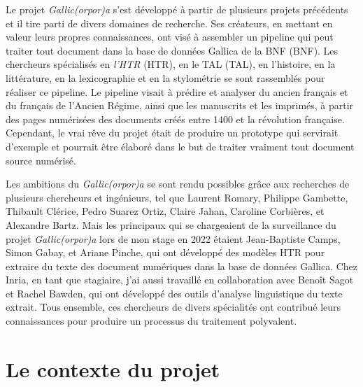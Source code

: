 \documentclass[class=article, crop=false]{standalone}
\begin{document}
Le projet \textit{Gallic(orpor)a} s'est développé à partir de plusieurs projets précédents et il tire parti de divers domaines de recherche. Ses créateurs, en mettant en valeur leurs propres connaissances, ont visé à assembler un pipeline qui peut traiter tout document dans la base de données Gallica de la \acrlong{BNF} (\acrshort{BNF}). Les chercheurs spécialisés en \textit{l'\acrlong{HTR}} (\acrshort{HTR}), en le \acrlong{TAL} (\acrshort{TAL}), en l'histoire, en la littérature, en la lexicographie et en la stylométrie se sont rassemblés pour réaliser ce pipeline. Le pipeline visait à prédire et analyser du ancien français et du français de l'Ancien Régime, ainsi que les manuscrits et les imprimés, à partir des pages numérisées des documents créés entre 1400 et la révolution française. Cependant, le vrai rêve du projet était de produire un prototype qui servirait d'exemple et pourrait être élaboré dans le but de traiter vraiment tout document source numérisé.

Les ambitions du \textit{Gallic(orpor)a} se sont rendu possibles grâce aux recherches de plusieurs chercheurs et ingénieurs, tel que Laurent Romary, Philippe Gambette, Thibault Clérice, Pedro Suarez Ortiz, Claire Jahan, Caroline Corbières, et Alexandre Bartz. Mais les principaux qui se chargeaient de la surveillance du projet \textit{Gallic(orpor)a} lors de mon stage en 2022 étaient Jean-Baptiste Camps, Simon Gabay, et Ariane Pinche, qui ont développé des modèles \acrshort{HTR} pour extraire du texte des document numériques dans la base de données Gallica. Chez \Gls{Inria}, en tant que stagiaire, j'ai aussi travaillé en collaboration avec  Benoît Sagot et Rachel Bawden, qui ont développé des outils d'analyse linguistique du texte extrait. Tous ensemble, ces chercheurs de divers spécialités ont contribué leurs connaissances pour produire un processus du traitement polyvalent.

\section{Le contexte du projet}
\end{document}
